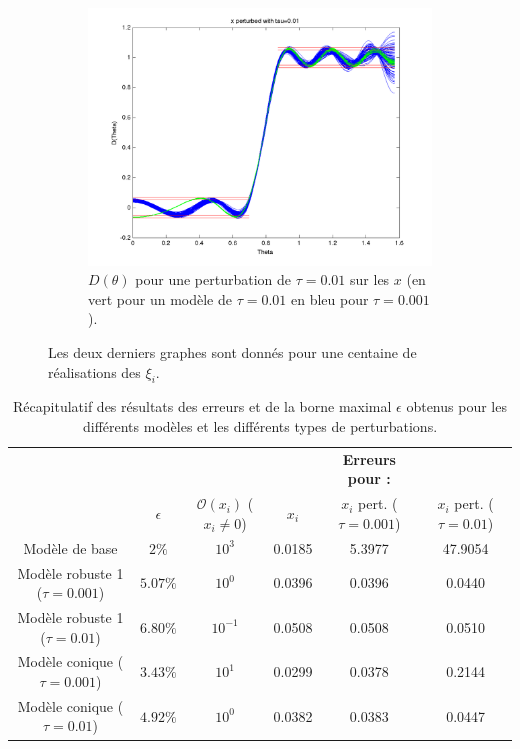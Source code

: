\begin{figure}[h!]
\begin{subfigure}[b]{0.32\textwidth}
  \end{subfigure}
  ~ 
  \begin{subfigure}[b]{0.32\textwidth}
  \includegraphics[width=\textwidth]{D-ModRobust1-test3Rob01.png}
  \caption{$D(\theta)$ pour une perturbation de $\tau = 0.01$ sur les $x$ (en vert pour un modèle de $\tau=0.01$ en bleu pour $\tau=0.001$).}
  \label{fig:D-ModRobust1-test3RobTau01}
  \end{subfigure}
\caption{Les deux derniers graphes sont donnés pour une centaine de réalisations des $\xi_i$.}
\label{fig:ModROBUST1}
  \end{figure}

\begin{table}
\centering
\begin{tabular}{c|c|c|ccc}
 & & &  &\textbf{Erreurs pour : } &\\
 & $\epsilon$ & $\mathcal{O}( x_i)$ ($x_i\neq0$) &$x_i$ & $x_i$ pert. ($\tau=0.001$) & $x_i$ pert. ($\tau=0.01$) \\
 \hline
Modèle de base & $2\%$ & $10^3$ &0.0185 & 5.3977 & 47.9054 \\
\hline
Modèle robuste 1 ($\tau=0.001$) & $5.07 \%$ & $10^0$& 0.0396 & 0.0396  & 0.0440 \\
Modèle robuste 1 ($\tau=0.01$)  & $6.80 \%$ &$10^{-1}$ &0.0508 & 0.0508 & 0.0510 \\
\hline
Modèle conique ($\tau=0.001$) & $3.43 \%$ & $10^1$ & 0.0299 & 0.0378 & 0.2144\\
Modèle conique ($\tau=0.01$) & $4.92 \%$& $10^0$& 0.0382 & 0.0383 & 0.0447
\end{tabular}
\caption{Récapitulatif des résultats des erreurs et de la borne maximal $\epsilon$ obtenus pour les différents modèles et les différents types de perturbations.}
\label{table:Recap}
\end{table}
\FloatBarrier